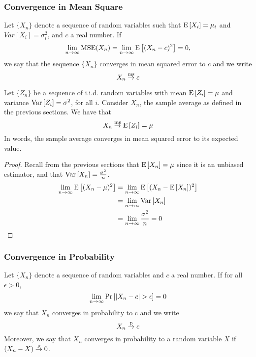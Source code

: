 \subsubsection{Convergence in Mean Square}

\begin{definition} 
Let $\{X_n\}$ denote a sequence of random variables such that $\operatorname{E}\left[X_i\right] = \mu_i$ and $Var[X_i] = \sigma_i^2$, and $c$ a real number. If $$ \lim_{n\to\infty} \operatorname{MSE}(X_n) = \lim_{n\to\infty} \operatorname{E}\left[(X_n - c)^2\right] = 0, $$ we say that the sequence $\{X_n\}$ converges in mean squared error to $c$ and we write $$ X_n\overset{\text{ms}}{\to} c $$
\end{definition}

\begin{proposition} 
Let $\{Z_n\}$ be a sequence of i.i.d. random variables with mean $\operatorname{E}\left[Z_i\right] = \mu$ and variance $\operatorname{Var}\left[Z_i\right] = \sigma^2$, for all $i$. Consider $X_n$, the sample average as defined in the previous sections. We have that $$ X_n \overset{\text{ms}}{\to} \operatorname{E}\left[Z_i\right] = \mu $$ In words, the sample average converges in mean squared error to its expected value.
\end{proposition} 

\begin{proof}
Recall from the previous sections that $\operatorname{E}\left[X_n\right] = \mu$ since it is an unbiased estimator, and that $\operatorname{Var}\left[X_n\right] = \frac{\sigma^2}{n}$. \begin{align*}
\lim_{n\to\infty} \operatorname{E}\left[(X_n - \mu)^2\right] & = \lim_{n\to\infty} \operatorname{E}\left[(X_n - \operatorname{E}\left[X_n\right])^2\right] \\ & = \lim_{n\to\infty} \operatorname{Var}\left[X_n\right] \\ & = \lim_{n\to\infty} \frac{\sigma^2}{n} = 0
\end{align*}
\end{proof}

\subsubsection{Convergence in Probability}

\begin{definition}
Let $\{X_n\}$ denote a sequence of random variables and $c$ a real number. If for all $\epsilon > 0$, $$ \lim_{n\to\infty} \operatorname{Pr}\left[\lvert X_n - c \rvert > \epsilon\right] = 0 $$
we say that $X_n$ converges in probability to c and we write $$ X_n \overset{\text{p}}{\to} c $$
Moreover, we say that $X_n$ converges in probability to a random variable $X$ if $(X_n - X)\overset{\text{p}}{\to} 0$.
\end{definition}

